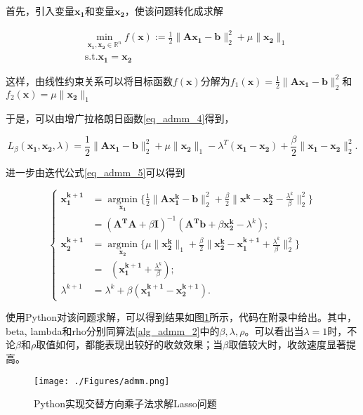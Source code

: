 \begin{solution}
    首先，引入变量$\bm{x_{1}}$和变量$\bm{x_{2}}$，使该问题转化成求解

    \begin{equation}
        \begin{split}
            &\mathop{\mathrm{min}}\limits_{\bm{x_{1}, x_{2}}\in \mathbb{R}^{n}} f(\bm{x}) := \frac{1}{2}\|\bm{A} \bm{x_{1}}-\bm{b}\|_{2}^{2} + \mu\|\bm{x_{2}}\|_{1} \\
            &\mathrm{s. t.} \bm{x_{1}} = \bm{x_{2}}
        \end{split}
    \end{equation}

    这样，由线性约束关系可以将目标函数$f(\bm{x})$分解为$f_{1}(\bm{x}) = \frac{1}{2}\|\bm{A} \bm{x_{1}}-\bm{b}\|_{2}^{2}$和$f_{2}(\bm{x}) = \mu\|\bm{x_{2}}\|_{1}$

    于是，可以由增广拉格朗日函数\ref{eq_admm_4}得到，

    \begin{equation*}
        L_{\beta}(\bm{x_{1}}, \bm{x_{2}}, \lambda) = \frac{1}{2} \|\bm{Ax_{1}-b}\|_{2}^{2} + \mu \|\bm{x_{2}}\|_{1} - \lambda^{T}(\bm{x_{1}-x_{2}}) + \frac{\beta}{2} \|\bm{x_{1}-x_{2}}\|_{2}^{2}.
    \end{equation*}

    进一步由迭代公式\ref{eq_admm_5}可以得到

    \begin{equation}
        \begin{cases}
            \bm{x_{1}^{k+1}} &= \mathop{\mathrm{argmin}}\limits_{\bm{x_{1}}} \{ \frac{1}{2}\|\bm{Ax_{1}^{k}}-\bm{b}\|_{2}^{2} + \frac{\beta}{2}\|\bm{x^{k}} - \bm{x_{2}^{k}} -\frac{\lambda^{k}}{\beta}\|_{2}^{2} \} \\
                             &= (\bm{A^{T}A}+\beta\bm{I})^{-1}(\bm{A^{T}b} + \beta\bm{x_{2}^{k}} - \lambda^{k}) ; \\
            \bm{x_{2}^{k+1}} &= \mathop{\mathrm{argmin}}\limits_{\bm{x_{2}}} \{ \mu\|\bm{x_{2}^{k}}\|_{1} + \frac{\beta}{2} \|\bm{x_{2}^{k}}-\bm{x_{1}^{k+1}}+\frac{\lambda^{k}}{\beta}\|_{2}^{2}\} \\
                             &= \mathop{\mathrm{prox_{\frac{\mu}{\beta}\|\cdot\|_{1}}}}(\bm{x_{1}^{k+1}} + \frac{\lambda^{k}}{\beta}) ; \\
            \lambda^{k+1} &= \lambda^{k} + \beta(\bm{x_{1}^{k+1}-\bm{x_{2}^{k+1}}}).
        \end{cases}
    \end{equation}

    使用Python对该问题求解，可以得到结果如图\ref{figure_admm}所示，代码在附录中给出。其中，beta, lambda和rho分别同算法\ref{alg_admm_2}中的$\beta, \lambda, \rho$。可以看出当$\lambda=1$时，不论$\beta$和$\rho$取值如何，都能表现出较好的收敛效果；当$\beta$取值较大时，收敛速度显著提高。
    \begin{figure}[hbtp]
        \centering
        \texttt{[image: ./Figures/admm.png]}
        \caption{Python实现交替方向乘子法求解Lasso问题}
        \label{figure_admm}
    \end{figure}
\end{solution}